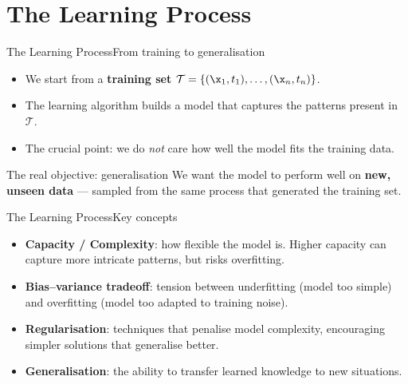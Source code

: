 \section{The Learning Process}

\begin{frame}{The Learning Process}{From training to generalisation}
  \begin{itemize}
    \item We start from a \textcolor{AccentBlue}{\textbf{training set}}
          $\mathcal{T} = \{(\x_1, t_1), \ldots, (\x_n, t_n)\}$.
    \item The learning algorithm builds a model that captures the patterns present in
          $\mathcal{T}$.
    \item The crucial point: we do \emph{not} care how well the model fits the training data.
  \end{itemize}
  \bigskip
  \begin{alertblock}{The real objective: generalisation}
    We want the model to perform well on \textbf{new, unseen data} — sampled from the same
    process that generated the training set.
  \end{alertblock}
\end{frame}

\begin{frame}{The Learning Process}{Key concepts}
  \begin{itemize}
    \item \textbf{Capacity / Complexity}: how flexible the model is.
          Higher capacity can capture more intricate patterns, but risks overfitting.
    \item \textbf{Bias–variance tradeoff}: tension between underfitting (model too simple)
          and overfitting (model too adapted to training noise).
    \item \textbf{Regularisation}: techniques that penalise model complexity, encouraging
          simpler solutions that generalise better.
    \item \textbf{Generalisation}: the ability to transfer learned knowledge to new
          situations.
  \end{itemize}
\end{frame}

